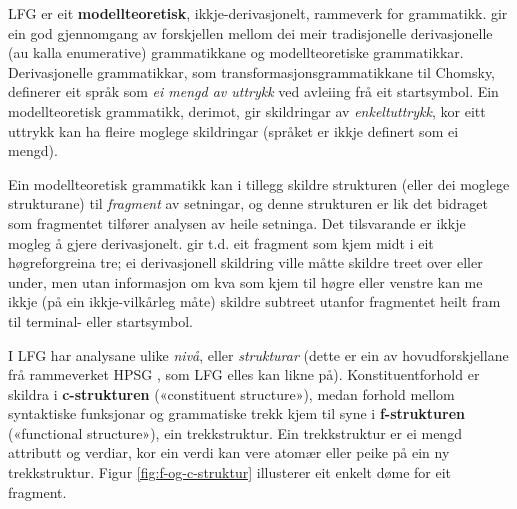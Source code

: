 \documentclass[12pt,a4paper,oneside,draft]{report}
\begin{document}
 LFG er eit \textbf{modellteoretisk}, ikkje-derivasjonelt, rammeverk for
 grammatikk.  \citet{pullum2001dbm} gir ein god gjennomgang av
 forskjellen mellom dei meir tradisjonelle derivasjonelle (au kalla
 enumerative) grammatikkane og modellteoretiske
 grammatikkar. Derivasjonelle grammatikkar, som
 transformasjonsgrammatikkane til Chomsky, definerer eit språk som \emph{ei  mengd av uttrykk} ved avleiing frå eit startsymbol. Ein
 modellteoretisk grammatikk, derimot, gir skildringar av
 \emph{enkeltuttrykk}, kor eitt uttrykk kan ha fleire moglege skildringar
 (språket er ikkje definert som ei mengd).

 Ein modellteoretisk grammatikk kan i tillegg skildre strukturen
 (eller dei moglege strukturane) til \emph{fragment} av setningar, og denne
 strukturen er lik det bidraget som fragmentet tilfører analysen av
 heile setninga. Det tilsvarande er ikkje mogleg å gjere
 derivasjonelt. \citet[s.~32--33]{pullum2001dbm} gir t.d. eit fragment
 som kjem midt i eit høgreforgreina tre; ei derivasjonell skildring
 ville måtte skildre treet over eller under, men utan informasjon om
 kva som kjem til høgre eller venstre kan me ikkje (på ein
 ikkje-vilkårleg måte) skildre subtreet utanfor fragmentet heilt fram
 til terminal- eller startsymbol.

 I LFG har analysane ulike \emph{nivå}, eller \emph{strukturar} (dette er ein av
 hovudforskjellane frå rammeverket HPSG \citep{swb-hpsg}, som LFG
 elles kan likne på). Konstituentforhold er skildra i \textbf{c-strukturen}
 («constituent structure»), medan forhold mellom syntaktiske
 funksjonar og grammatiske trekk kjem til syne i \textbf{f-strukturen}
 («functional structure»), ein trekkstruktur. Ein trekkstruktur er ei
 mengd attributt og verdiar, kor ein verdi kan vere atomær eller peike
 på ein ny trekkstruktur.  Figur \ref{fig:f-og-c-struktur} illusterer
 eit enkelt døme for eit fragment.
\end{document}

